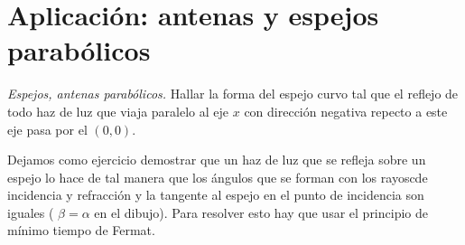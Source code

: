 \section{Aplicación: antenas y espejos parabólicos}

\begin{ejemplo}{}
\textit{Espejos, antenas parabólicos.} Hallar la forma del espejo curvo tal que el reflejo de todo haz de luz que viaja paralelo al eje $x$ con dirección
negativa repecto a este eje pasa por el $(0,0)$.
\end{ejemplo}


\begin{ejercicio}{} 
  Dejamos como ejercicio demostrar que un haz de luz que se refleja sobre un espejo lo hace de tal manera que los ángulos que se forman con los rayoscde incidencia y refracción y la tangente al espejo en el punto de incidencia son iguales ( $\beta=\alpha$ en el dibujo). Para resolver esto hay que usar el principio
de mínimo tiempo de Fermat.
\end{ejercicio}

